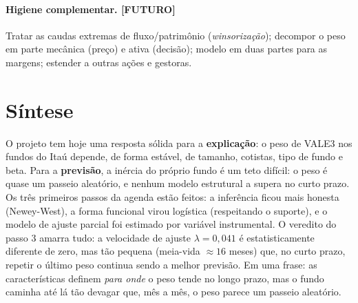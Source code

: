 \documentclass[11pt,a4paper]{article}
\newcommand{\futuro}{\textcolor{fazerb}{\textbf{[FUTURO]}}}
\begin{document}
\paragraph{Higiene complementar. \futuro} Tratar as caudas extremas de fluxo/patrimônio
(\emph{winsorização}); decompor o peso em parte mecânica (preço) e ativa (decisão); modelo em duas
partes para as margens; estender a outras ações e gestoras.

\section{Síntese}
O projeto tem hoje uma resposta sólida para a \textbf{explicação}: o peso de VALE3 nos fundos do
Itaú depende, de forma estável, de tamanho, cotistas, tipo de fundo e beta. Para a
\textbf{previsão}, a inércia do próprio fundo é um teto difícil: o peso é quase um passeio
aleatório, e nenhum modelo estrutural a supera no curto prazo. Os três primeiros passos da agenda
estão feitos: a inferência ficou mais honesta (Newey-West), a forma funcional virou logística
(respeitando o suporte), e o modelo de ajuste parcial foi estimado por variável instrumental. O
veredito do passo 3 amarra tudo: a velocidade de ajuste $\lambda=0{,}041$ é estatisticamente
diferente de zero, mas tão pequena (meia-vida $\approx16$ meses) que, no curto prazo, repetir o
último peso continua sendo a melhor previsão. Em uma frase: as características definem \emph{para
onde} o peso tende no longo prazo, mas o fundo caminha até lá tão devagar que, mês a mês, o peso
parece um passeio aleatório.

\end{document}
